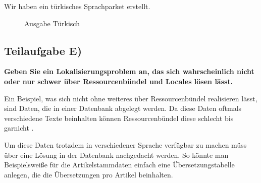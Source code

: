 Wir haben ein türkisches Sprachparket erstellt.

\begin{figure}[htb]
\begin{center}
\caption{Ausgabe Türkisch}
\end{center}
\end{figure}

\subsection{Teilaufgabe E)}
\textbf{Geben Sie ein Lokalisierungsproblem an, das sich wahrscheinlich nicht oder nur schwer
über Ressourcenbündel und Locales lösen lässt.}

Ein Beispiel, was sich nicht ohne weiteres über Ressourcenbündel realisieren
lässt, sind Daten, die in einer Datenbank abgelegt werden. Da diese Daten
oftmals verschiedene Texte beinhalten können Ressourcenbündel diese schlecht bis
garnicht . 

Um diese Daten trotzdem in verschiedener Sprache verfügbar zu machen müss über
eine Lösung in der Datenbank nachgedacht werden. So könnte man Beispielsweiße
für die Artikelstammdaten einfach eine Übersetzungstabelle anlegen, die die
Übersetzungen pro Artikel beinhalten.

\clearpage